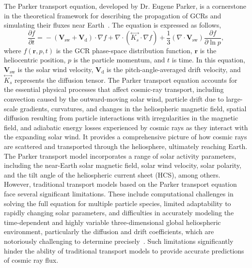 \documentclass[twocolumn,,12pt]{aastex631}
\begin{document}
The Parker transport equation, developed by Dr. Eugene Parker, is a cornerstone in the theoretical framework for describing the propagation of GCRs and simulating their fluxes near Earth~\cite{parker1965passage}. The equation is expressed as follows,
\begin{equation}
\!\!\!\!\frac{\partial f}{\partial t}\! =\! -(\bm{V}_{\mathrm{sw}}\!+\!\bm{V}_\mathrm{d}) \cdot\! \nabla f  +\nabla \! \cdot \!\left(\! \stackrel{\leftrightarrow}{K_s} \!\cdot \!\nabla f \!\right) + \frac{1}{3} (\nabla \cdot \bm{V}_\mathrm{sw}) \frac{\partial f}{\partial \ln p},
\end{equation}
where $f(\bm{r}, p, t)$ is the GCR phase-space distribution function, $\bm{r}$ is the heliocentric position, $p$ is the particle momentum, and $t$ is time. In this equation, $\bm{V}_{\mathrm{sw}}$ is the solar wind velocity, $\bm{V}_\mathrm{d}$ is the pitch-angle-averaged drift velocity, and $\stackrel{\leftrightarrow}{K_s}$ represents the diffusion tensor. The Parker transport equation accounts for the essential physical processes that affect cosmic-ray transport, including convection caused by the outward-moving solar wind, particle drift due to large-scale gradients, curvatures, and changes in the heliospheric magnetic field, spatial diffusion resulting from particle interactions with irregularities in the magnetic field, and adiabatic energy losses experienced by cosmic rays as they interact with the expanding solar wind. It provides a comprehensive picture of how cosmic rays are scattered and transported through the heliosphere, ultimately reaching Earth. The Parker transport model incorporates a range of solar activity parameters, including the near-Earth solar magnetic field, solar wind velocity, solar polarity, and the tilt angle of the heliospheric current sheet (HCS), among others. However, traditional transport models based on the Parker transport equation face several significant limitations. These include computational challenges in solving the full equation for multiple particle species, limited adaptability to rapidly changing solar parameters, and difficulties in accurately modeling the time-dependent and highly variable three-dimensional global heliospheric environment, particularly the diffusion and drift coefficients, which are notoriously challenging to determine precisely~\cite{song2021numerical}. Such limitations significantly hinder the ability of traditional transport models to provide accurate predictions of cosmic ray flux.

\end{document}

